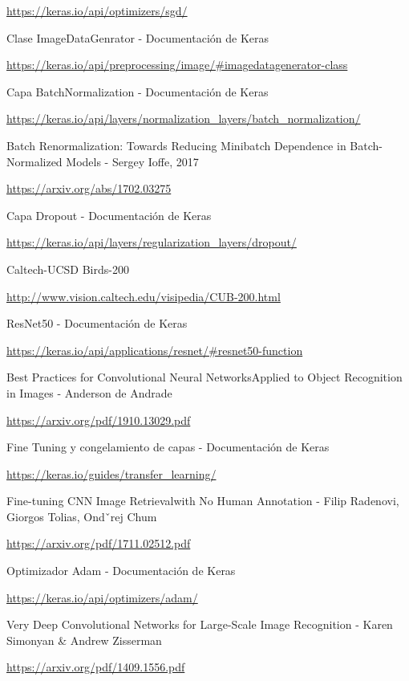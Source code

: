 \documentclass[12pt, spanish]{article}
\begin{document}
\begin{thebibliography}{9}
	\url{https://keras.io/api/optimizers/sgd/}


	Clase ImageDataGenrator - Documentación de Keras

	\url{https://keras.io/api/preprocessing/image/#imagedatagenerator-class}



	Capa BatchNormalization - Documentación de Keras

	\url{https://keras.io/api/layers/normalization_layers/batch_normalization/}



	Batch Renormalization: Towards Reducing Minibatch Dependence in Batch-Normalized Models - Sergey Ioffe, 2017

	\url{https://arxiv.org/abs/1702.03275}



	Capa Dropout - Documentación de Keras

	\url{https://keras.io/api/layers/regularization_layers/dropout/}



	Caltech-UCSD Birds-200

	\url{http://www.vision.caltech.edu/visipedia/CUB-200.html}


	ResNet50 - Documentación de Keras

	\url{https://keras.io/api/applications/resnet/#resnet50-function}



	Best Practices for Convolutional Neural NetworksApplied to Object Recognition in Images - Anderson de Andrade

	\url{https://arxiv.org/pdf/1910.13029.pdf}



	Fine Tuning y congelamiento de capas - Documentación de Keras

	\url{https://keras.io/guides/transfer_learning/}



	Fine-tuning CNN Image Retrievalwith No Human Annotation - Filip Radenovi, Giorgos Tolias, Ondˇrej Chum

	\url{https://arxiv.org/pdf/1711.02512.pdf}



	Optimizador Adam - Documentación de Keras

	\url{https://keras.io/api/optimizers/adam/}



	Very Deep Convolutional Networks for Large-Scale Image Recognition - Karen Simonyan \& Andrew Zisserman

	\url{https://arxiv.org/pdf/1409.1556.pdf}

\end{thebibliography}
\end{document}
